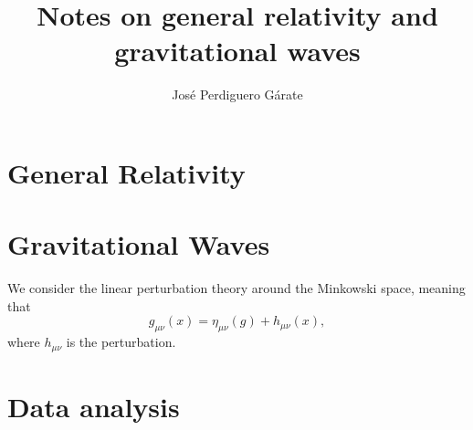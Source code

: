 \documentclass[a4paper]{article}
\title{Notes on general relativity and gravitational waves}
\author{Jos\'e Perdiguero G\'arate}
\begin{document}
\maketitle


\section{General Relativity}

\section{Gravitational Waves}

We consider the linear perturbation theory around the Minkowski space, meaning that 
\begin{equation}
    g_{\mu\nu} (x) = \eta_{\mu\nu}(g) + h_{\mu\nu}(x),
\end{equation}
where $h_{\mu\nu}$ is the perturbation.

\section{Data analysis}
\end{document}
